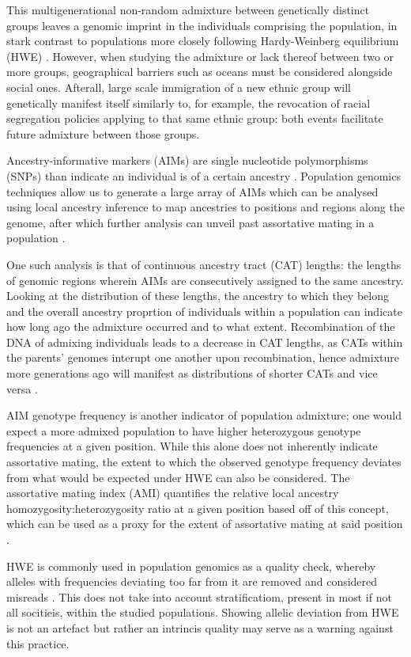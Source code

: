 \documentclass[11pt]{article}
\begin{document}
This multigenerational non-random admixture between genetically distinct groups leaves a genomic imprint in the individuals comprising the population, in stark contrast to populations more closely following Hardy-Weinberg equilibrium (HWE) \parencite{Zaitlen2017}. However, when studying the admixture or lack thereof between two or more groups, geographical barriers such as oceans must be considered alongside social ones. Afterall, large scale immigration of a new ethnic group will genetically manifest itself similarly to, for example, the revocation of racial segregation policies applying to that same ethnic group: both events facilitate future admixture between those groups.

Ancestry-informative markers (AIMs) are single nucleotide polymorphisms (SNPs) than indicate an individual is of a certain ancestry \parencite{Risch2009}. Population genomics techniques allow us to generate a large array of AIMs which can be analysed using local ancestry inference to map ancestries to positions and regions along the genome, after which further analysis can unveil past assortative mating in a population \parencite{Schubert2020}.

One such analysis is that of continuous ancestry tract (CAT) lengths: the lengths of genomic regions wherein AIMs are consecutively assigned to the same ancestry. Looking at the distribution of these lengths, the ancestry to which they belong and the overall ancestry proprtion of individuals within a population can indicate how long ago the admixture occurred and to what extent. Recombination of the DNA of admixing individuals leads to a decrease in CAT lengths, as CATs within the parents' genomes interupt one another upon recombination, hence admixture more generations ago will manifest as distributions of shorter CATs and vice versa \parencite{Gravel2012}. 

AIM genotype frequency is another indicator of population admixture; one would expect a more admixed population to have higher heterozygous genotype frequencies at a given position. While this alone does not inherently indicate assortative mating, the extent to which the observed genotype frequency deviates from what would be expected under HWE can also be considered. The assortative mating index (AMI) quantifies the relative local ancestry homozygosity:heterozygosity ratio at a given position based off of this concept, which can be used as a proxy for the extent of assortative mating at said position \parencite{Norris2019}.

HWE is commonly used in population genomics as a quality check, whereby alleles with frequencies deviating too far from it are removed and considered misreads \parencite{Linares-Pineda2012}. This does not take into account stratificatiom, present in most if not all socitieis, within the studied populations. Showing allelic deviation from HWE is not an artefact but rather an intrincis quality may serve as a warning against this practice.
\end{document}
